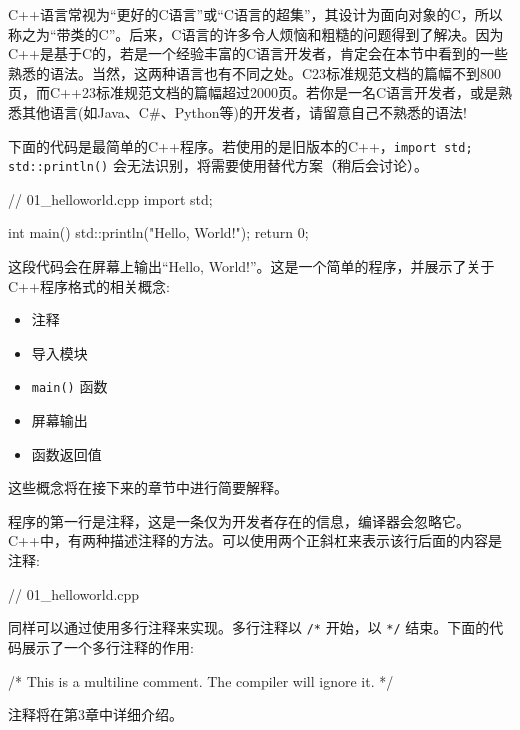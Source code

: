 
C++语言常视为“更好的C语言”或“C语言的超集”，其设计为面向对象的C，所以称之为“带类的C”。后来，C语言的许多令人烦恼和粗糙的问题得到了解决。因为C++是基于C的，若是一个经验丰富的C语言开发者，肯定会在本节中看到的一些熟悉的语法。当然，这两种语言也有不同之处。C23标准规范文档的篇幅不到800页，而C++23标准规范文档的篇幅超过2000页。若你是一名C语言开发者，或是熟悉其他语言(如Java、C\#、Python等)的开发者，请留意自己不熟悉的语法!


下面的代码是最简单的C++程序。若使用的是旧版本的C++，\verb|import std; std::println()| 会无法识别，将需要使用替代方案（稍后会讨论）。

\begin{cpp}
// 01_helloworld.cpp
import std;

int main()
{
    std::println("Hello, World!");
    return 0;
}
\end{cpp}

这段代码会在屏幕上输出“Hello, World!”。这是一个简单的程序，并展示了关于C++程序格式的相关概念:

\begin{itemize}
\item
注释

\item
导入模块

\item
\verb|main()| 函数

\item
屏幕输出

\item
函数返回值
\end{itemize}

这些概念将在接下来的章节中进行简要解释。


程序的第一行是注释，这是一条仅为开发者存在的信息，编译器会忽略它。C++中，有两种描述注释的方法。可以使用两个正斜杠来表示该行后面的内容是注释:

\begin{cpp}
// 01_helloworld.cpp
\end{cpp}

同样可以通过使用多行注释来实现。多行注释以 \verb|/*| 开始，以 \verb|*/| 结束。下面的代码展示了一个多行注释的作用:

\begin{cpp}
/* This is a multiline comment.
   The compiler will ignore it.
*/
\end{cpp}

注释将在第3章中详细介绍。


